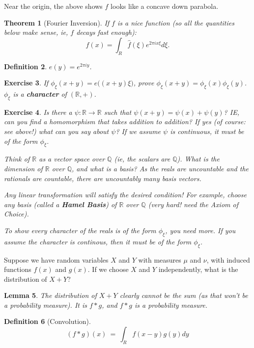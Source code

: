 \documentclass[12pt,letterpaper]{report}
\newcommand\be{\begin{equation}}
\newcommand\ee{\end{equation}}
\newcommand{\R}{\ensuremath{\mathbb{R}}}
\newcommand{\Q}{\mathbb{Q}}
\newtheorem{thm}{Theorem}[section]
\newtheorem{lem}[thm]{Lemma}
\newtheorem{defi}[thm]{Definition}
\newtheorem{exe}[thm]{Exercise}
\begin{document}
Near the origin, the above shows $\hat{f}$ looks like a concave
down parabola.

\begin{thm}[Fourier Inversion] If $f$ is a nice function (so all
the quantities below make sense, ie, $f$ decays fast enough): \be
f(x) = \int_R \hat{f}(\xi) e^{2\pi i x \xi} d\xi. \ee
\end{thm}

\begin{defi} $e(y) = e^{2\pi i y}$. \end{defi}

\begin{exe}
If $\phi_\xi(x+y) = e\Big((x+y)\xi\Big)$, prove $\phi_\xi(x+y) =
\phi_\xi(x) \phi_\xi(y)$. $\phi_\xi$ is a \textbf{character} of
$(\R,+)$.
\end{exe}

\begin{exe} Is there a $\psi:\R \rightarrow \R$ such that $\psi(x+y)
= \psi(x) + \psi(y)$? IE, can you find a homomorphism that takes
addition to addition? If yes (of course: see above!) what can you
say about $\psi$? If we assume $\psi$ is continuous, it must be of
the form $\phi_\xi$.

Think of $\R$ as a vector space over $\Q$ (ie, the scalars are
$\Q$). What is the dimension of $\R$ over $\Q$, and what is a
basis? As the reals are uncountable and the rationals are
countable, there are uncountably many basis vectors.

Any linear transformation will satisfy the desired condition! For
example, choose any basis (called a \textbf{Hamel Basis}) of $\R$
over $\Q$ (very hard! need the Axiom of Choice).

To show every character of the reals is of the form $\phi_\xi$,
you need more. If you assume the character is continous, then it
must be of the form $\phi_\xi$.
\end{exe}

Suppose we have random variables $X$ and $Y$ with measures $\mu$
and $\nu$, with induced functions $f(x)$ and $g(x)$. If we choose
$X$ and $Y$ independently, what is the distribution of $X + Y$?

\begin{lem} The distribution of $X+Y$ clearly cannot be the sum (as that
won't be a probability measure). It is $f \ast g$, and $f \ast g$
is a probability measure. \end{lem}

\begin{defi}[Convolution]
\be (f \ast g)(x) \ = \ \int_R f(x-y)g(y)dy \ee
\end{defi}
\end{document}
